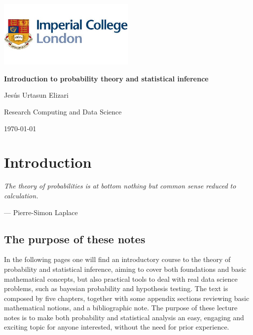 \documentclass{book}
\begin{document}

\frontmatter

\begin{titlepage}
    \centering
    \includegraphics[width=0.5\textwidth]{figures/frontpage/icl_logo.jpeg} 
    \vfill
    {\Huge\bfseries Introduction to probability theory and statistical inference\par}
    \vspace{1cm}
    {\Large Jes\'us Urtasun Elizari\par}
    \vspace{1cm}
     {\Large Research Computing and Data Science\par}
    \vspace{1cm}
    {\large\today\par}
    \vspace*{\fill}
\end{titlepage}

\tableofcontents

\clearpage
\printindex

\mainmatter



\chapter*{Introduction}

\epigraph{\textit{The theory of probabilities is at bottom nothing but common sense reduced to calculation.}}{— Pierre-Simon Laplace}

\section*{The purpose of these notes}

In the following pages one will find an introductory course to the theory of probability and statistical inference, aiming to cover both foundations and basic mathematical concepts, but also practical tools to deal with real data science problems, such as bayesian probability and hypothesis testing. The text is composed by five chapters, together with some appendix sections reviewing basic mathematical notions, and a bibliographic note. The purpose of these lecture notes is to make both probability and statistical analysis an easy, engaging and exciting topic for anyone interested, without the need for prior experience.
\end{document}
